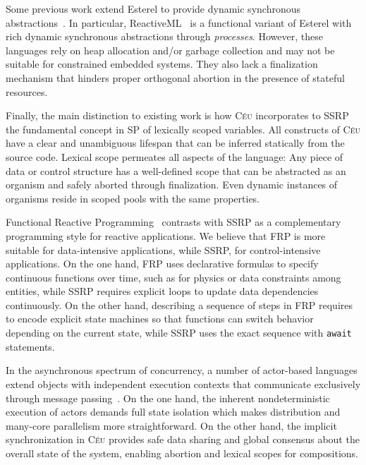 \documentclass{sigplanconf}
\newcommand{\CEU}{\textsc{C\'{e}u}\xspace}
\newcommand{\code}[1] {{\small{\texttt{#1}}}}
\newcommand{\1}{\;}
\newcommand{\2}{\;\;}
\newcommand{\3}{\;\;\;}
\newcommand{\5}{\;\;\;\;\;}
\begin{document}
Some previous work extend Esterel to provide dynamic synchronous 
abstractions~\cite{rp.scripts,rp.oo,sugarcubes}.
%
In particular, ReactiveML~\cite{rml} is a functional variant of Esterel with 
rich dynamic synchronous abstractions through \emph{processes}.
%
However, these languages rely on heap allocation and/or garbage collection and 
may not be suitable for constrained embedded systems.
%
%
They also lack a finalization mechanism that hinders proper orthogonal abortion 
in the presence of stateful resources.

Finally, the main distinction to existing work is how \CEU incorporates to SSRP 
the fundamental concept in SP of lexically scoped variables.
%
All constructs of \CEU have a clear and unambiguous lifespan that can be 
inferred statically from the source code.
%
Lexical scope permeates all aspects of the language:
Any piece of data or control structure has a well-defined scope that can be 
abstracted as an organism and safely aborted through finalization.
%
Even dynamic instances of organisms reside in scoped pools with the same 
properties.
%

Functional Reactive Programming~\cite{frp.principles} contrasts with SSRP as a
complementary programming style for reactive applications.
%
We believe that FRP is more suitable for data-intensive applications, while 
SSRP, for control-intensive applications.
%
On the one hand, FRP uses declarative formulas to specify continuous functions 
over time, such as for physics or data constraints among entities, while SSRP 
requires explicit loops to update data dependencies continuously.
%
On the other hand, describing a sequence of steps in FRP requires to encode 
explicit state machines so that functions can switch behavior depending on the 
current state, while SSRP uses the exact sequence with \code{await} statements.

In the asynchronous spectrum of concurrency, a number of actor-based languages 
extend objects with independent execution contexts that communicate exclusively 
through message 
passing~\cite{agha.salsa,actors.thorn,actors.jcobox,actors.capsule}.
%
On the one hand, the inherent nondeterministic execution of actors demands full 
state isolation which makes distribution and many-core parallelism more 
straightforward.
%
On the other hand, the implicit synchronization in \CEU provides safe data 
sharing and global consensus about the overall state of the system, enabling 
abortion and lexical scopes for compositions.
\end{document}
